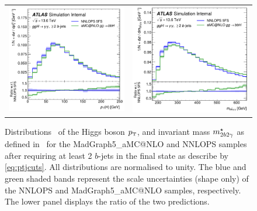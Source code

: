 \documentclass[11pt,a4paper]{article}
\begin{document}
\begin{figure}[t!]
\begin{center}
\begin{tabular}{cc}
\includegraphics[width=.45\textwidth, page=1]{plots/ATLAS/BJetCuts_Higgs1_Pt_shape_comparison_ratio.pdf}&
\includegraphics[width=.45\textwidth, page=1]{plots/ATLAS/BJetCuts_yybb_Mass_shape_comparison_ratio.pdf}
\end{tabular}
\vspace*{1ex}
\caption{Distributions~\cite{atlaspub} of the Higgs boson $\pt$, and invariant mass $m_{2b2\gamma}^{\star}$ as defined in~  for the {\sc MadGraph5\_aMC@NLO} and {\sc NNLOPS} samples after requiring at least 2 $b$-jets in the final state as describe by \eqref{eq:ptjcuts}. All distributions are normalised to unity. The blue and green shaded bands represent the scale uncertainties (shape only) of the {\sc NNLOPS} and {\sc MadGraph5\_aMC@NLO} samples, respectively. The lower panel displays the ratio of the two predictions.\label{fig:4fsNNLOPS}}
\end{center}
\end{figure}

\end{document}
